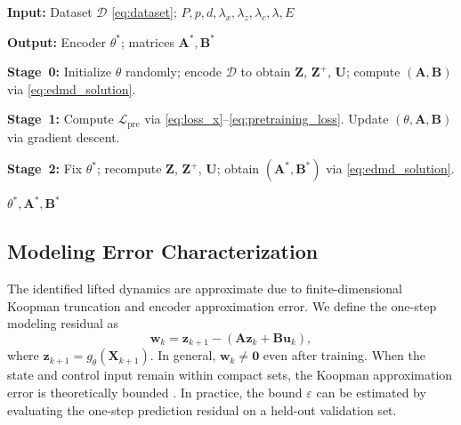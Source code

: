 \documentclass[journal]{IEEEtran}
\newcommand{\vu}{\mathbf{u}}
\newcommand{\vz}{\mathbf{z}}
\newcommand{\vw}{\mathbf{w}}
\newcommand{\mA}{\mathbf{A}}
\newcommand{\mB}{\mathbf{B}}
\newcommand{\mX}{\mathbf{X}}
\newcommand{\mZ}{\mathbf{Z}}
\newcommand{\mU}{\mathbf{U}}
\begin{document}
\begin{algorithm}[!t]
\caption{Transformer-Koopman Training Algorithm}
\label{alg:training}
\begin{algorithmic}[1]

\STATE \textbf{Input:} Dataset $\mathcal{D}$ \eqref{eq:dataset};
$P, p, d, \lambda_x, \lambda_z, \lambda_c, \lambda, E$

\STATE \textbf{Output:} Encoder $\theta^{*}$; matrices $\mA^{*}, \mB^{*}$

\STATE \textbf{Stage~0:}
Initialize $\theta$ randomly; encode $\mathcal{D}$ to obtain
$\mZ$, $\mZ^{+}$, $\mU$; compute $(\mA,\mB)$ via \eqref{eq:edmd_solution}.

\vspace{2pt}

\STATE \textbf{Stage~1:}
        \STATE Compute $\mathcal{L}_{\mathrm{pre}}$
               via \eqref{eq:loss_x}--\eqref{eq:pretraining_loss}.
        \STATE Update $(\theta, \mA, \mB)$ via gradient descent.
    \ENDFOR
\ENDFOR

\vspace{2pt}

\STATE \textbf{Stage~2:}
Fix $\theta^{*}$; recompute $\mZ$, $\mZ^{+}$, $\mU$;
obtain $(\mA^{*}, \mB^{*})$ via \eqref{eq:edmd_solution}.

\RETURN $\theta^{*}, \mA^{*}, \mB^{*}$

\end{algorithmic}
\end{algorithm}

\subsection{Modeling Error Characterization}
\label{subsec:modeling_error}

The identified lifted dynamics are approximate due to finite-dimensional Koopman truncation and encoder approximation error. We define the one-step modeling residual as
\begin{equation}
    \vw_k = \vz_{k+1} - (\mA \vz_k + \mB \vu_k),
    \label{eq:modeling_error}
\end{equation}
where $\vz_{k+1} = g_\theta(\mX_{k+1})$. In general, $\vw_k \neq \mathbf{0}$ even after training. When the state and control input remain within compact sets, the Koopman approximation error is theoretically bounded \cite{korda2018linear}. In practice, the bound $\varepsilon$ can be estimated by evaluating the one-step prediction residual on a held-out validation set.
\end{document}
